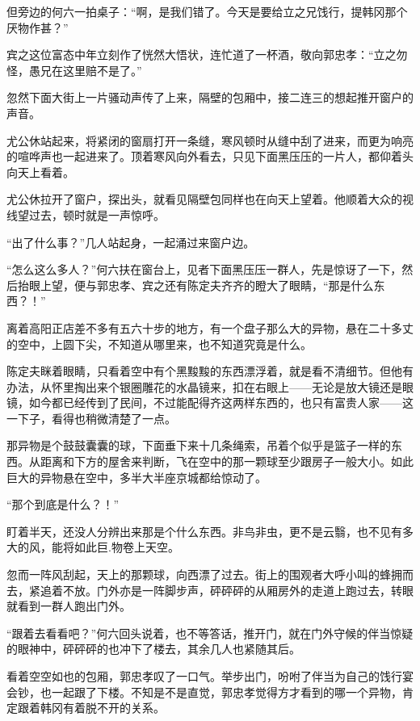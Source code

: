 但旁边的何六一拍桌子：“啊，是我们错了。今天是要给立之兄饯行，提韩冈那个厌物作甚？”

宾之这位富态中年立刻作了恍然大悟状，连忙道了一杯酒，敬向郭忠孝：“立之勿怪，愚兄在这里赔不是了。”

忽然下面大街上一片骚动声传了上来，隔壁的包厢中，接二连三的想起推开窗户的声音。

尤公休站起来，将紧闭的窗扇打开一条缝，寒风顿时从缝中刮了进来，而更为响亮的喧哗声也一起进来了。顶着寒风向外看去，只见下面黑压压的一片人，都仰着头向天上看着。

尤公休拉开了窗户，探出头，就看见隔壁包同样也在向天上望着。他顺着大众的视线望过去，顿时就是一声惊呼。

“出了什么事？”几人站起身，一起涌过来窗户边。

“怎么这么多人？”何六扶在窗台上，见者下面黑压压一群人，先是惊讶了一下，然后抬眼上望，便与郭忠孝、宾之还有陈定夫齐齐的瞪大了眼睛，“那是什么东西？！”

离着高阳正店差不多有五六十步的地方，有一个盘子那么大的异物，悬在二十多丈的空中，上圆下尖，不知道从哪里来，也不知道究竟是什么。

陈定夫眯着眼睛，只看着空中有个黑黢黢的东西漂浮着，就是看不清细节。但他有办法，从怀里掏出来个银圈雕花的水晶镜来，扣在右眼上——无论是放大镜还是眼镜，如今都已经传到了民间，不过能配得齐这两样东西的，也只有富贵人家——这一下子，看得也稍微清楚了一点。

那异物是个鼓鼓囊囊的球，下面垂下来十几条绳索，吊着个似乎是篮子一样的东西。从距离和下方的屋舍来判断，飞在空中的那一颗球至少跟房子一般大小。如此巨大的异物悬在空中，多半大半座京城都给惊动了。

“那个到底是什么？！”

盯着半天，还没人分辨出来那是个什么东西。非鸟非虫，更不是云翳，也不见有多大的风，能将如此巨.物卷上天空。

忽而一阵风刮起，天上的那颗球，向西漂了过去。街上的围观者大呼小叫的蜂拥而去，紧追着不放。门外亦是一阵脚步声，砰砰砰的从厢房外的走道上跑过去，转眼就看到一群人跑出门外。

“跟着去看看吧？”何六回头说着，也不等答话，推开门，就在门外守候的伴当惊疑的眼神中，砰砰砰的也冲下了楼去，其余几人也紧随其后。

看着空空如也的包厢，郭忠孝叹了一口气。举步出门，吩咐了伴当为自己的饯行宴会钞，也一起跟了下楼。不知是不是直觉，郭忠孝觉得方才看到的哪一个异物，肯定跟着韩冈有着脱不开的关系。

